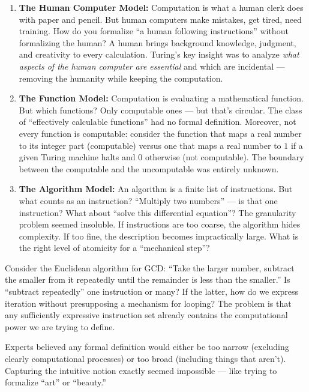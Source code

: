 \begin{enumerate}
\item \textbf{The Human Computer Model:} Computation is what a human clerk does with paper and pencil. But human computers make mistakes, get tired, need training. How do you formalize ``a human following instructions'' without formalizing the human? A human brings background knowledge, judgment, and creativity to every calculation. Turing's key insight was to analyze \emph{what aspects of the human computer are essential} and which are incidental --- removing the humanity while keeping the computation.

\item \textbf{The Function Model:} Computation is evaluating a mathematical function. But which functions? Only computable ones --- but that's circular. The class of ``effectively calculable functions'' had no formal definition. Moreover, not every function is computable: consider the function that maps a real number to its integer part (computable) versus one that maps a real number to $1$ if a given Turing machine halts and $0$ otherwise (not computable). The boundary between the computable and the uncomputable was entirely unknown.

\item \textbf{The Algorithm Model:} An algorithm is a finite list of instructions. But what counts as an instruction? ``Multiply two numbers'' --- is that one instruction? What about ``solve this differential equation''? The granularity problem seemed insoluble. If instructions are too coarse, the algorithm hides complexity. If too fine, the description becomes impractically large. What is the right level of atomicity for a ``mechanical step''?
\end{enumerate}

Consider the Euclidean algorithm for GCD: ``Take the larger number, subtract the smaller from it repeatedly until the remainder is less than the smaller.'' Is ``subtract repeatedly'' one instruction or many? If the latter, how do we express iteration without presupposing a mechanism for looping? The problem is that any sufficiently expressive instruction set already contains the computational power we are trying to define.

Experts believed any formal definition would either be too narrow (excluding clearly computational processes) or too broad (including things that aren't). Capturing the intuitive notion exactly seemed impossible --- like trying to formalize ``art'' or ``beauty.''

